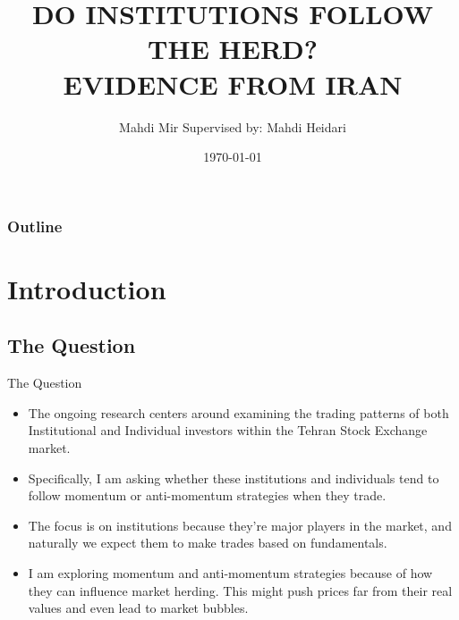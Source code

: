 \documentclass{beamer}
\title[]{\MakeUppercase{Do Institutions Follow the Herd? \\ Evidence from Iran}}
\subtitle{}
\author[]{Mahdi Mir \newline Supervised by: Mahdi Heidari}
\institute[TeIAS]{Tehran Institute for Advanced Studies}
\date[TeIAS]{\today}
\begin{document}

\begin{frame}
    \titlepage{}
\end{frame}


\begin{frame}[label=toc]
    \frametitle{Outline}
    \tableofcontents{}
\end{frame}



\section{Introduction}







\subsection{The Question}

\begin{frame}{The Question}

    \begin{itemize}
        \item The ongoing research centers around examining the trading patterns of both Institutional and Individual investors within the Tehran Stock Exchange market.
        \item Specifically, I am asking whether these institutions and individuals tend to follow momentum or anti-momentum strategies when they trade.
        \item The focus is on institutions because they're major players in the market, and naturally we expect them to make trades based on fundamentals.
        \item I am exploring momentum and anti-momentum strategies because of how they can influence market herding. This might push prices far from their real values and even lead to market bubbles.
    \end{itemize}

\end{frame}







\end{document}
